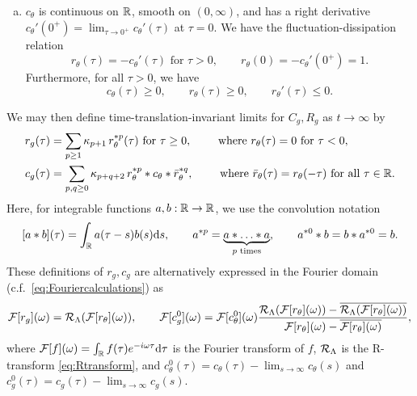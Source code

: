 \begin{lemma}
\begin{enumerate}[(a)]
\begin{equation}\label{eq:rthetabound}
\begin{gathered}
|R_\theta(t,s)| \leq Ce^{-c(t-s)}, \qquad
|r_\theta(\tau)| \leq Ce^{-c\tau},\\
|R_\theta(t,s)-r_\theta(t-s)| \leq Ce^{-cs}, \qquad
\int_0^t |R_\theta(t,s)-r_\theta(t-s)| \d s \leq Ce^{-ct}.
\end{gathered}
\end{equation}
\item $c_\theta$ is continuous on $\mathbb{R}$, smooth on $(0,\infty)$,
and has a right derivative $c_\theta'(0^+)=\lim_{\tau \to 0^+} c_\theta'(\tau)$
at $\tau=0$. We have the fluctuation-dissipation relation
\begin{equation}\label{eq:crthetaFDT}
r_\theta(\tau)={-}c_\theta'(\tau) \text{ for } \tau>0,
\qquad r_\theta(0)={-}c_\theta'(0^+)=1.
\end{equation}
Furthermore, for all $\tau>0$, we have
\[c_\theta(\tau) \geq 0,
\qquad r_\theta(\tau) \geq 0, \qquad r_\theta'(\tau) \leq 0.\]
\end{enumerate}
\end{lemma}

We may then define time-translation-invariant limits for $C_g,R_g$ as $t \to
\infty$ by
\begin{align*}
r_g(\tau)&=\sum_{p \geq 1} \kappa_{p+1}\,r_\theta^{\ast p}(\tau) \text{ for } \tau \geq 0,
\qquad \text{ where } r_\theta(\tau)=0 \text{ for } \tau<0,\\
c_g(\tau)&=\sum_{p,q \geq 0} \kappa_{p+q+2}\,
r_\theta^{\ast p} * c_\theta * \bar r_\theta^{\ast q},
\qquad \text{ where } \bar r_\theta(\tau)=r_\theta(-\tau) \text{ for all } \tau
\in \mathbb{R}.
\end{align*}
Here, for integrable functions $a,b:\mathbb{R} \to \mathbb{R}$, we use the convolution notation
\[[a*b](\tau)=\int_{\mathbb{R}} a(\tau-s)b(s)\mathrm{d} s,
\qquad a^{*p}=\underbrace{a*\ldots*a}_{p \text{ times}},
\qquad a^{*0}*b=b*a^{*0}=b.\]
These definitions of $r_g,c_g$ are alternatively expressed in the Fourier
domain (c.f.\ \eqref{eq:Fouriercalculations}) as
\begin{equation}\label{eq:Fourierrgcg}
\mathcal{F}[r_g](\omega)=\mathcal{R}_\Lambda(\mathcal{F}[r_\theta](\omega)),
\qquad
\mathcal{F}[c_g^0](\omega)=\mathcal{F}[c_\theta^0](\omega)
\frac{\mathcal{R}_\Lambda(\mathcal{F}[r_\theta](\omega))
-\overline{\mathcal{R}_\Lambda(\mathcal{F}[r_\theta](\omega))}}
{\mathcal{F}[r_\theta](\omega)-\overline{\mathcal{F}[r_\theta](\omega)}},
\end{equation}
where $\mathcal{F}[f](\omega)=\int_{\mathbb{R}} f(\tau)e^{-i\omega\tau}\mathrm{d}\tau$ is the Fourier
transform of $f$, $\mathcal{R}_\Lambda$ is the R-transform \eqref{eq:Rtransform}, and $c_\theta^0(\tau)=c_\theta(\tau)-\lim_{s \to \infty} c_\theta(s)$ and $c_g^0(\tau)=c_g(\tau)-\lim_{s \to \infty} c_g(s)$.

